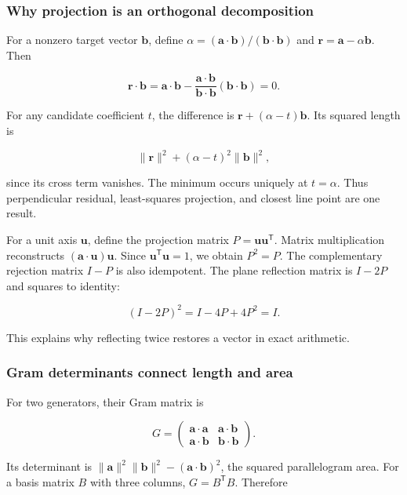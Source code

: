 \subsubsection{Why projection is an orthogonal decomposition}\label{02-foundations-ii-ch039-why-projection-is-an-orthogonal-decomposition}

For a nonzero target vector \(\mathbf b\), define \(\alpha=(\mathbf a\cdot\mathbf b)/(\mathbf b\cdot\mathbf b)\) and \(\mathbf r=\mathbf a-\alpha\mathbf b\). Then

\[
\mathbf r\cdot\mathbf b=\mathbf a\cdot\mathbf b-
\frac{\mathbf a\cdot\mathbf b}{\mathbf b\cdot\mathbf b}(\mathbf b\cdot\mathbf b)=0.
\]

For any candidate coefficient \(t\), the difference is \(\mathbf r+(\alpha-t)\mathbf b\). Its squared length is

\[
\|\mathbf r\|^2+(\alpha-t)^2\|\mathbf b\|^2,
\]

since its cross term vanishes. The minimum occurs uniquely at \(t=\alpha\). Thus perpendicular residual, least-squares projection, and closest line point are one result.

For a unit axis \(\mathbf u\), define the projection matrix \(P=\mathbf u\mathbf u^\mathsf T\). Matrix multiplication reconstructs \((\mathbf a\cdot\mathbf u)\mathbf u\). Since \(\mathbf u^\mathsf T\mathbf u=1\), we obtain \(P^2=P\). The complementary rejection matrix \(I-P\) is also idempotent. The plane reflection matrix is \(I-2P\) and squares to identity:

\[
(I-2P)^2=I-4P+4P^2=I.
\]

This explains why reflecting twice restores a vector in exact arithmetic.

\subsubsection{Gram determinants connect length and area}\label{02-foundations-ii-ch039-gram-determinants-connect-length-and-area}

For two generators, their Gram matrix is

\[
G=\begin{pmatrix}\mathbf a\cdot\mathbf a&\mathbf a\cdot\mathbf b\\
\mathbf a\cdot\mathbf b&\mathbf b\cdot\mathbf b\end{pmatrix}.
\]

Its determinant is \(\|\mathbf a\|^2\|\mathbf b\|^2-(\mathbf a\cdot\mathbf b)^2\), the squared parallelogram area. For a basis matrix \(B\) with three columns, \(G=B^\mathsf TB\). Therefore

